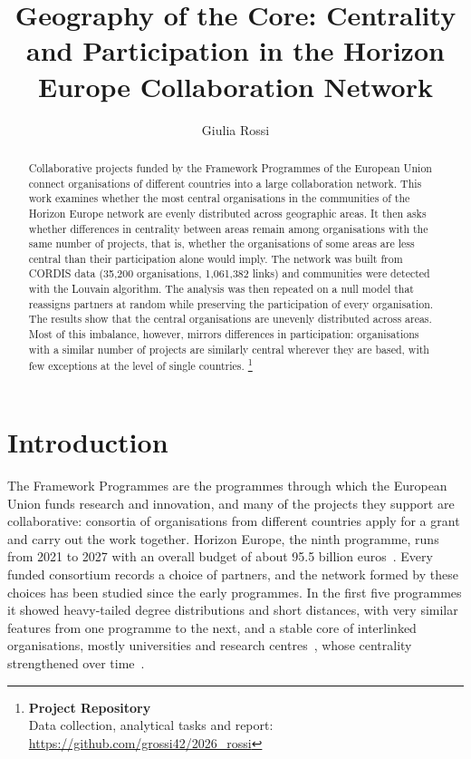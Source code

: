 \documentclass[sigchi]{acmart}
\begin{document}
\title[Geography of the Core]{Geography of the Core: Centrality and Participation in the Horizon Europe Collaboration Network}

\author{Giulia Rossi}

\renewcommand{\shortauthors}{G. Rossi}

\begin{abstract}
Collaborative projects funded by the Framework Programmes of the European Union connect organisations of different countries into a large collaboration network. This work examines whether the most central organisations in the communities of the Horizon Europe network are evenly distributed across geographic areas. It then asks whether differences in centrality between areas remain among organisations with the same number of projects, that is, whether the organisations of some areas are less central than their participation alone would imply. The network was built from CORDIS data (35,200 organisations, 1,061,382 links) and communities were detected with the Louvain algorithm. The analysis was then repeated on a null model that reassigns partners at random while preserving the participation of every organisation. The results show that the central organisations are unevenly distributed across areas. Most of this imbalance, however, mirrors differences in participation: organisations with a similar number of projects are similarly central wherever they are based, with few exceptions at the level of single countries.
\footnote{
{\bf Project Repository}\\
\noindent Data collection, analytical tasks and report: \url{https://github.com/grossi42/2026_rossi}}
\end{abstract}


\maketitle
\bigskip
\section{Introduction}

The Framework Programmes are the programmes through which the European Union funds research and innovation, and many of the projects they support are collaborative: consortia of organisations from different countries apply for a grant and carry out the work together. Horizon Europe, the ninth programme, runs from 2021 to 2027 with an overall budget of about 95.5 billion euros~\cite{regulation,ep2021}. Every funded consortium records a choice of partners, and the network formed by these choices has been studied since the early programmes. In the first five programmes it showed heavy-tailed degree distributions and short distances, with very similar features from one programme to the next, and a stable core of interlinked organisations, mostly universities and research centres~\cite{roediger2008}, whose centrality strengthened over time~\cite{breschi2004}.
\end{document}

